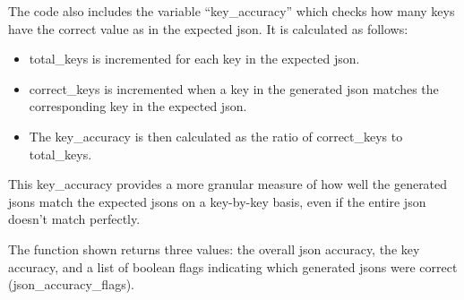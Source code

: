 The code also includes the variable ``key\_accuracy'' which checks how many keys have the correct value as in the expected \gls{json}. It is calculated as follows:
\begin{itemize}
    \item total\_keys is incremented for each key in the expected \gls{json}.
    \item correct\_keys is incremented when a key in the generated \gls{json} matches the corresponding key in the expected \gls{json}.
    \item The key\_accuracy is then calculated as the ratio of correct\_keys to total\_keys.
\end{itemize}
This key\_accuracy provides a more granular measure of how well the generated \glspl{json} match the expected \glspl{json} on a key-by-key basis, even if the entire \gls{json} doesn't match perfectly.

The function shown returns three values: the overall \gls{json} accuracy, the key accuracy, and a list of boolean flags indicating which generated \glspl{json} were correct (json\_accuracy\_flags).

